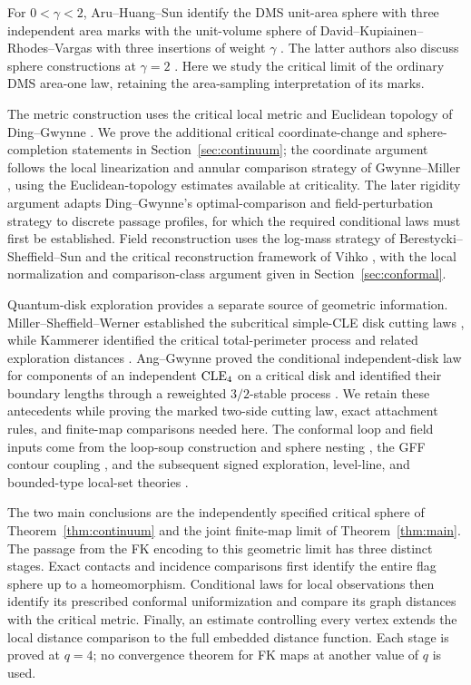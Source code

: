 For $0<\gamma<2$, Aru--Huang--Sun identify the DMS unit-area sphere
with three independent area marks with the unit-volume sphere of
David--Kupiainen--Rhodes--Vargas with three insertions of weight $\gamma$
\cite[Theorem~1.1]{AHSSphereEquivalence}.
The latter authors also discuss sphere constructions at
$\gamma=2$ \cite[Section~4.1]{DKRVSphere}.
Here we study the critical limit of the ordinary DMS area-one law,
retaining the area-sampling interpretation of its marks.

The metric construction uses the critical local metric and Euclidean topology
of Ding--Gwynne \cite{DGuniqueness,DGtopology}.  We prove the additional
critical coordinate-change and sphere-completion statements in
Section~\ref{sec:continuum}; the coordinate argument follows the
local linearization and annular comparison strategy of Gwynne--Miller
\cite[Sections~2--3]{GMCovariance}, using the Euclidean-topology estimates
available at criticality.  The later rigidity argument adapts Ding--Gwynne's
optimal-comparison and field-perturbation strategy to discrete passage
profiles, for which the required conditional laws must first be established.
Field reconstruction uses the log-mass strategy of
Berestycki--Sheffield--Sun and the critical reconstruction framework of Vihko
\cite{BSSReconstruction,VihkoReconstruction}, with the local normalization and
comparison-class argument given in Section~\ref{sec:conformal}.

Quantum-disk exploration provides a separate source of geometric information.
Miller--Sheffield--Werner established the subcritical simple-CLE disk cutting
laws \cite{MSWQuantum}, while Kammerer identified the critical total-perimeter
process and related exploration distances \cite{Kammerer}.
Ang--Gwynne proved the conditional independent-disk law for components of an
independent $\mathrm{CLE}_4$ on a critical disk and identified their boundary lengths
through a reweighted $3/2$-stable process
\cite[Theorems~1.1--1.2]{AngGwynneCritical}.
We retain these antecedents while proving the marked two-side cutting law,
exact attachment rules, and finite-map comparisons needed here.
The conformal loop and field inputs come from the loop-soup construction and
sphere nesting \cite{SWcle,KWnested}, the GFF contour coupling
\cite{SchrammSheffieldContour}, and the subsequent signed exploration,
level-line, and bounded-type local-set theories
\cite{MSWTrunk,WangWu,ASWlocal,ASlocal}.

The two main conclusions are the independently specified critical sphere of
Theorem~\ref{thm:continuum} and the joint finite-map limit of
Theorem~\ref{thm:main}. The passage from the FK encoding to this geometric
limit has three distinct stages. Exact contacts and incidence comparisons
first identify the entire flag sphere up to a homeomorphism. Conditional
laws for local observations then identify its prescribed conformal
uniformization and compare its graph distances with the critical metric.
Finally, an estimate controlling every vertex extends the local distance
comparison to the full embedded distance function. Each stage is proved
at $q=4$; no convergence theorem for FK maps at another value of $q$ is used.

